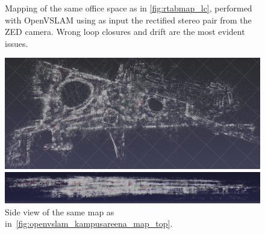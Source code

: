 \documentclass[11pt, letterpaper, twoside]{article}
\begin{document}
\begin{figure}[tb]
    \caption{%
        Mapping of the same office space as in \cref{fig:rtabmap_lc}, performed
        with OpenVSLAM using as input the rectified stereo pair from the ZED
        camera. Wrong loop closures and drift are the most evident issues.
    }\label{fig:openvslam_lc}
\end{figure}

\begin{figure}[tb]
    \centering

    \includegraphics[width=\textwidth]{openvslam_kampusareena_map_top.png}
    \caption{%
        Map of the first and second floors of Kampusareena (396~723 keypoints),
        generated with OpenVSLAM using as input the rectified stereo pair from
        the ZED camera.
    }\label{fig:openvslam_kampusareena_map_top}

    \vspace{1em}

    \includegraphics[width=\textwidth]{openvslam_kampusareena_map_side.png}
    \caption{%
        Side view of the same map as in~\cref{fig:openvslam_kampusareena_map_top}.
    }\label{fig:openvslam_kampusareena_map_side}
\end{figure}
\end{document}
